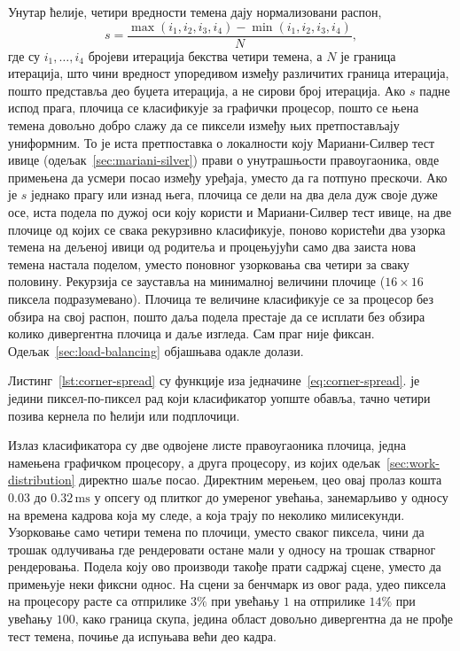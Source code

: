 \documentclass[serbian]{ftndiplomski}
\begin{document}
Унутар ћелије, четири вредности темена дају нормализовани распон,
\begin{equation}
  \label{eq:corner-spread}
  s = \frac{\max(i_1,i_2,i_3,i_4) - \min(i_1,i_2,i_3,i_4)}{N},
\end{equation}
где су $i_1,\dots,i_4$ бројеви итерација бекства четири темена, а $N$ је граница
итерација, што чини вредност упоредивом између различитих граница итерација, пошто
представља део буџета итерација, а не сирови број итерација. Ако $s$ падне испод
прага, плочица се класификује за графички процесор, пошто се њена темена довољно
добро слажу да се пиксели између њих претпостављају униформним. То је иста
претпоставка о локалности коју Мариани-Силвер тест ивице (одељак~\ref{sec:mariani-silver})
прави о унутрашњости правоугаоника, овде примењена да усмери посао између уређаја,
уместо да га потпуно прескочи. Ако је $s$ једнако прагу или изнад њега, плочица се
дели на два дела дуж своје дуже осе, иста подела по дужој оси коју користи и
Мариани-Силвер тест ивице, на две плочице од којих се свака рекурзивно
класификује, поново користећи два узорка темена на дељеној ивици од родитеља и
процењујући само два заиста нова темена настала поделом, уместо поновног узорковања
сва четири за сваку половину. Рекурзија се зауставља на минималној величини плочице
($16 \times 16$ пиксела подразумевано). Плочица те величине класификује се за
процесор без обзира на свој распон, пошто даља подела престаје да се исплати без
обзира колико дивергентна плочица и даље изгледа. Сам праг није фиксан.
Одељак~\ref{sec:load-balancing} објашњава одакле долази.

Листинг~\ref{lst:corner-spread} су функције иза једначине~\ref{eq:corner-spread}.
 је једини пиксел-по-пиксел рад који класификатор уопште
обавља, тачно четири позива кернела по ћелији или подплочици.

\noindent\begin{minipage}{\linewidth}

\end{minipage}

Излаз класификатора су две одвојене листе правоугаоника плочица, једна намењена
графичком процесору, а друга процесору, из којих одељак~\ref{sec:work-distribution}
директно шаље посао. Директним мерењем, цео овај пролаз кошта $0.03$ до
$0.32\,\mathrm{ms}$ у опсегу од плитког до умереног увећања, занемарљиво у односу на
времена кадрова која му следе, а која трају по неколико милисекунди. Узорковање само
четири темена по плочици, уместо сваког пиксела, чини да трошак одлучивања где
рендеровати остане мали у односу на трошак стварног рендеровања. Подела коју ово
производи такође прати садржај сцене, уместо да примењује неки фиксни однос. На сцени
за бенчмарк из овог рада, удео пиксела на процесору расте са отприлике $3\%$ при
увећању $1$ на отприлике $14\%$ при увећању $100$, како граница скупа, једина
област довољно дивергентна да не прође тест темена, почиње да испуњава већи део
кадра.
\end{document}
